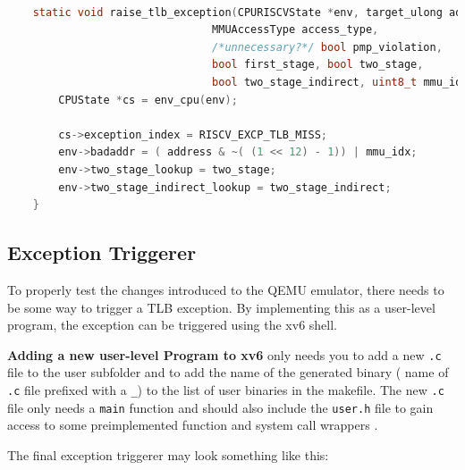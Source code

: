 \begin{lstlisting}[language=c,float=h!,
    caption={Setup-Code for raising a TLB Exception. The \texttt{cs-\textgreater exception\_index} variable needs
    to be set to the custom \texttt{TLB Exception} enum value. The \texttt{env-\textgreater badaddr} variable
    will end up in the \texttt{mtval} register. The address will be page-aligned first, by zeroing out the
    lowest 12 bits. This is used to encode the \texttt{mmu\_idx} into the faulting address. Why this is
    necessary is explained in Section \ref{sect:tlbwrite}},
    label={lst:exceptionThrow}]

    static void raise_tlb_exception(CPURISCVState *env, target_ulong address,
                                MMUAccessType access_type,
                                /*unnecessary?*/ bool pmp_violation,
                                bool first_stage, bool two_stage,
                                bool two_stage_indirect, uint8_t mmu_idx) {
        CPUState *cs = env_cpu(env);

        cs->exception_index = RISCV_EXCP_TLB_MISS;
        env->badaddr = ( address & ~( (1 << 12) - 1)) | mmu_idx;
        env->two_stage_lookup = two_stage;
        env->two_stage_indirect_lookup = two_stage_indirect;
    }

\end{lstlisting}



\subsection{Exception Triggerer}
To properly test the changes introduced to the QEMU emulator, there needs to be some way to
trigger a TLB exception.
By implementing this as a user-level program, the exception can be triggered using the xv6 shell.

\textbf{Adding a new user-level Program to xv6} only needs you to add a new \texttt{.c} file to the user subfolder
and to add the name of the generated binary ( name of \texttt{.c} file prefixed with a \texttt{\_})
to the list of user binaries in the makefile.
The new \texttt{.c} file only needs a \texttt{main} function and should also include the \texttt{user.h}
file to gain access to some preimplemented function and system call wrappers \cite{xv6source}.

The final exception triggerer may look something like this:

